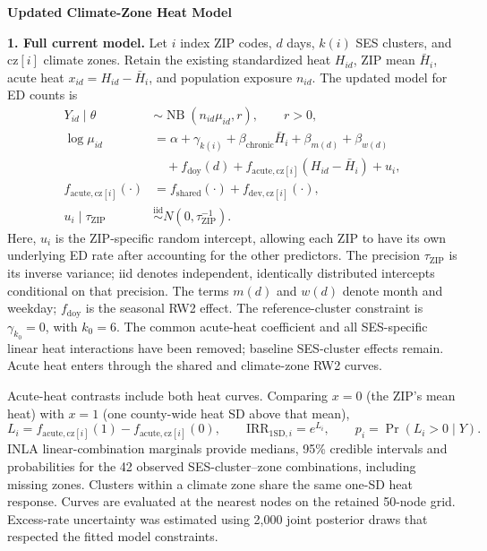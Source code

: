 \documentclass[10pt]{article}
\begin{document}
\begin{center}\large\bfseries Updated Climate-Zone Heat Model\end{center}

\textbf{1. Full current model.}
Let $i$ index ZIP codes, $d$ days, $k(i)$ SES clusters, and $\mathrm{cz}[i]$
climate zones. Retain the existing standardized heat $H_{id}$, ZIP mean
$\bar H_i$, acute heat $x_{id}=H_{id}-\bar H_i$, and population exposure $n_{id}$.
The updated model for ED counts is
\begin{align}
Y_{id}\mid\theta&\sim\operatorname{NB}(n_{id}\mu_{id},r),\qquad r>0,\nonumber\\
\log\mu_{id}&=\alpha+\gamma_{k(i)}+\beta_{\mathrm{chronic}}\bar H_i
+\beta_{m(d)}+\beta_{w(d)}\nonumber\\
&\quad+f_{\mathrm{doy}}(d)
+f_{\mathrm{acute},\mathrm{cz}[i]}(H_{id}-\bar H_i)+u_i,\label{eq:model}\\
f_{\mathrm{acute},\mathrm{cz}[i]}(\cdot)
&=f_{\mathrm{shared}}(\cdot)+f_{\mathrm{dev},\mathrm{cz}[i]}(\cdot),\nonumber\\
u_i\mid\tau_{\mathrm{ZIP}}&\overset{\mathrm{iid}}{\sim}N(0,\tau_{\mathrm{ZIP}}^{-1}).\nonumber
\end{align}
Here, $u_i$ is the ZIP-specific random intercept, allowing each ZIP to have
its own underlying ED rate after accounting for the other predictors.
The precision $\tau_{\mathrm{ZIP}}$ is its inverse variance; iid denotes
independent, identically distributed intercepts conditional on that precision.
The terms $m(d)$ and $w(d)$ denote month and weekday; $f_{\mathrm{doy}}$ is the
seasonal RW2 effect. The reference-cluster constraint is
$\gamma_{k_0}=0$, with $k_0=6$.
The common acute-heat coefficient and all SES-specific linear heat
interactions have been removed; baseline SES-cluster effects remain.
Acute heat enters through the shared and climate-zone RW2 curves.

Acute-heat contrasts include both heat curves. Comparing $x=0$ (the ZIP's
mean heat) with $x=1$ (one county-wide
heat SD above that mean),
\[
L_i=f_{\mathrm{acute},\mathrm{cz}[i]}(1)
-f_{\mathrm{acute},\mathrm{cz}[i]}(0),\qquad
\mathrm{IRR}_{1\mathrm{SD},i}=e^{L_i},\qquad
p_i=\Pr(L_i>0\mid Y).
\]
INLA linear-combination marginals provide medians, 95\% credible intervals
and probabilities for the 42 observed SES-cluster--zone combinations,
including missing zones. Clusters within a climate zone share the same
one-SD heat response. Curves are evaluated at the nearest nodes on the
retained 50-node grid. Excess-rate uncertainty was estimated using 2,000
joint posterior draws that respected the fitted model constraints.
\end{document}
